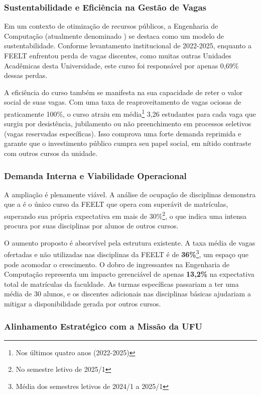 \subsubsection*{Sustentabilidade e Eficiência na Gestão de Vagas}

Em um contexto de otimização de recursos públicos, a Engenharia de Computação (atualmente denominado \nomecursonovo) se destaca como um modelo de sustentabilidade. Conforme levantamento institucional de 2022-2025, enquanto a FEELT enfrentou perda de vagas discentes, como muitas outras Unidades Acadêmicas desta Universidade, este curso foi responsável por apenas 0,69\% dessas perdas.

A eficiência do curso também se manifesta na sua capacidade de reter o valor social de suas vagas. Com uma taxa de reaproveitamento de vagas ociosas de praticamente 100\%, o curso atraiu em média\footnote{Nos últimos quatro anos (2022-2025)} 3,26 estudantes para cada vaga que surgiu por desistência, jubilamento ou não preenchimento em processos seletivos (vagas reservadas específicas). Isso comprova uma forte demanda reprimida e garante que o investimento público cumpra seu papel social, em nítido contraste com outros cursos da unidade.

\subsubsection*{Demanda Interna e Viabilidade Operacional}

A ampliação é plenamente viável. A análise de ocupação de disciplinas demonstra que a \nomecursonovo é o único curso da FEELT que opera com superávit de matrículas, superando sua própria expectativa em mais de 30\%\footnote{No semestre letivo de 2025/1}, o que indica uma intensa procura por suas disciplinas por alunos de outros cursos.

O aumento proposto é absorvível pela estrutura existente. A taxa média de vagas ofertadas e não utilizadas nas disciplinas da FEELT é de \textbf{36\%}\footnote{Média dos semestres letivos de 2024/1 a 2025/1}, um espaço que pode acomodar o crescimento. O dobro de ingressantes na Engenharia de Computação representa um impacto gerenciável de apenas \textbf{13,2\%} na expectativa total de matrículas da faculdade. As turmas específicas passariam a ter uma média de 30 alunos, e os discentes adicionais nas disciplinas básicas ajudariam a mitigar a disponibilidade gerada por outros cursos.

\subsubsection*{Alinhamento Estratégico com a Missão da UFU}

